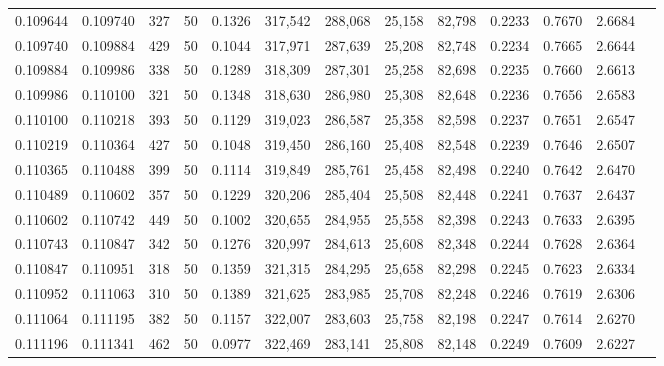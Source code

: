 \begin{tabular}{rrrrrrrrrrrrr}
0.109644 & 0.109740 &   327 &  50 &                                     0.1326 & 317,542 & 288,068 &  25,158 &  82,798 & 0.2233 & 0.7670 & 2.6684 \\
0.109740 & 0.109884 &   429 &  50 &                                     0.1044 & 317,971 & 287,639 &  25,208 &  82,748 & 0.2234 & 0.7665 & 2.6644 \\
0.109884 & 0.109986 &   338 &  50 &                                     0.1289 & 318,309 & 287,301 &  25,258 &  82,698 & 0.2235 & 0.7660 & 2.6613 \\
0.109986 & 0.110100 &   321 &  50 &                                     0.1348 & 318,630 & 286,980 &  25,308 &  82,648 & 0.2236 & 0.7656 & 2.6583 \\
0.110100 & 0.110218 &   393 &  50 &                                     0.1129 & 319,023 & 286,587 &  25,358 &  82,598 & 0.2237 & 0.7651 & 2.6547 \\
0.110219 & 0.110364 &   427 &  50 &                                     0.1048 & 319,450 & 286,160 &  25,408 &  82,548 & 0.2239 & 0.7646 & 2.6507 \\
0.110365 & 0.110488 &   399 &  50 &                                     0.1114 & 319,849 & 285,761 &  25,458 &  82,498 & 0.2240 & 0.7642 & 2.6470 \\
0.110489 & 0.110602 &   357 &  50 &                                     0.1229 & 320,206 & 285,404 &  25,508 &  82,448 & 0.2241 & 0.7637 & 2.6437 \\
0.110602 & 0.110742 &   449 &  50 &                                     0.1002 & 320,655 & 284,955 &  25,558 &  82,398 & 0.2243 & 0.7633 & 2.6395 \\
0.110743 & 0.110847 &   342 &  50 &                                     0.1276 & 320,997 & 284,613 &  25,608 &  82,348 & 0.2244 & 0.7628 & 2.6364 \\
0.110847 & 0.110951 &   318 &  50 &                                     0.1359 & 321,315 & 284,295 &  25,658 &  82,298 & 0.2245 & 0.7623 & 2.6334 \\
0.110952 & 0.111063 &   310 &  50 &                                     0.1389 & 321,625 & 283,985 &  25,708 &  82,248 & 0.2246 & 0.7619 & 2.6306 \\
0.111064 & 0.111195 &   382 &  50 &                                     0.1157 & 322,007 & 283,603 &  25,758 &  82,198 & 0.2247 & 0.7614 & 2.6270 \\
0.111196 & 0.111341 &   462 &  50 &                                     0.0977 & 322,469 & 283,141 &  25,808 &  82,148 & 0.2249 & 0.7609 & 2.6227 \\

\end{tabular}
